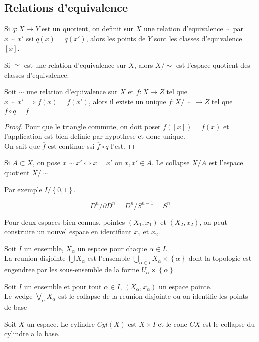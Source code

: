 \documentclass[../main.tex]{subfiles}
\begin{document}
\subsection{Relations d'equivalence}
Si $q:X\to Y$ est un quotient, on definit sur $X$ une relation d'equivalence $\sim $ par $x\sim x'$ ssi $q( x) =q( x') $, alors les points de $Y$ sont les classes d'equivalence $[x]$.\\
\begin{defn}
	Si $\simeq$ est une relation d'equivalence sur $X$, alors $X /\sim$ est l'espace quotient des classes d'equivalence.
\end{defn}
\begin{propo}
	
Soit $\sim$ une relation d'equivalence sur $X$ et $f:X\to Z$ tel que $x\sim x' \implies f( x) =f( x') $, alors il existe un unique $ \overline{f}: X /\sim \to Z$ tel que $ \overline{f}\circ q = f$ 
\end{propo}
\begin{proof}
Pour que le triangle commute, on doit poser $\overline{f}( [ x] ) = f( x) $ et l'application est bien definie par hypothese et donc unique.\\
On sait que $\overline{f}$ est continue ssi $\overline{f}\circ q $ l'est.
\end{proof}
\begin{defn}
	Si $A \subset X$, on pose $x\sim x' \iff x=x'$ ou $x,x' \in A$. Le collapse $X /A$ est l'espace quotient $X /\sim$ 
\end{defn}
Par exemple $I / \left\{ 0,1 \right\} $.
\begin{exemple}
\[ 
D^{n} /\partial D^{n}= D^{n} /S^{n-1}= S^{n}
\]


\end{exemple}
Pour deux espaces bien connus, pointes $( X_1,x_1) $ et $( X_2,x_2) $, on peut construire un nouvel espace en identifiant $x_1$ et $x_2$.\\
\begin{defn}
	Soit $I$ un ensemble, $X_\alpha$ un espace pour chaque $\alpha\in I$.\\
	La reunion disjointe $\bigcup X_\alpha$ est l'ensemble $\bigcup_{\alpha\in I} X_\alpha\times \left\{ \alpha \right\} $ dont la topologie est engendree par les sous-ensemble de la forme $U_\alpha\times \left\{ \alpha \right\} $ 
\end{defn}
\begin{defn}
Soit $I$ un ensemble et pour tout $\alpha \in I$, $( X_\alpha,x_\alpha) $ un espace pointe.\\
Le wedge $\bigvee_\alpha X_\alpha$ est le collapse de la reunion disjointe ou on identifie les points de base
\end{defn}
\begin{defn}
	Soit $X$ un espace. Le cylindre $Cyl( X)$ est $X\times I$ et le cone $CX$ est le collapse du cylindre a la base.
\end{defn}
\end{document}

